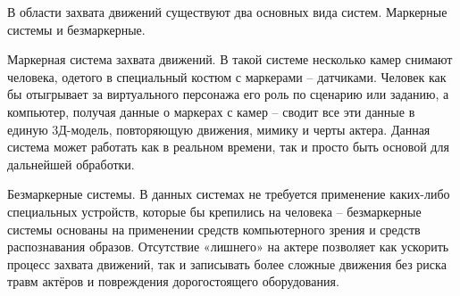 В области захвата движений существуют два основных вида систем. Маркерные системы и безмаркерные.

Маркерная система захвата движений. В такой системе несколько камер снимают человека, одетого в специальный костюм с маркерами – датчиками. Человек как бы отыгрывает за виртуального персонажа его роль по сценарию или заданию, а компьютер, получая данные о маркерах с камер – сводит все эти данные в единую 3Д-модель, повторяющую движения, мимику и черты актера. Данная система может работать как в реальном времени, так и просто быть основой для дальнейшей обработки.

Безмаркерные системы. В данных системах не требуется применение каких-либо специальных устройств, которые бы крепились на человека – безмаркерные системы основаны на применении средств компьютерного зрения и средств распознавания образов. Отсутствие «лишнего» на актере позволяет как ускорить процесс захвата движений, так и записывать более сложные движения без риска травм актёров и повреждения дорогостоящего оборудования.

